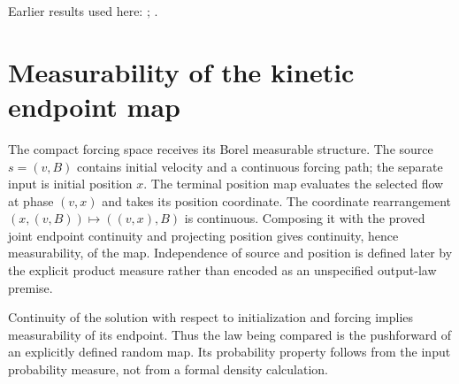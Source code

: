 \documentclass[11pt,a4paper]{article}
\begin{document}
Earlier results used here: \cite[Section~3.17.3]{LangevinLean2026ULASC}; \cite[Section~3.17.4]{LangevinLean2026ULASC}.

\section{\texorpdfstring{Measurability of the kinetic endpoint map}{Measurability of the kinetic endpoint map}}


The compact forcing space receives its Borel measurable structure. The source \(s=(v,B)\) contains initial velocity and a continuous forcing path; the separate input is initial position \(x\). The terminal position map evaluates the selected flow at phase \((v,x)\) and takes its position coordinate. The coordinate rearrangement \((x,(v,B))\mapsto((v,x),B)\) is continuous. Composing it with the proved joint endpoint continuity and projecting position gives continuity, hence measurability, of the map. Independence of source and position is defined later by the explicit product measure rather than encoded as an unspecified output-law premise.



Continuity of the solution with respect to initialization and forcing implies measurability of its endpoint. Thus the law being compared is the pushforward of an explicitly defined random map. Its probability property follows from the input probability measure, not from a formal density calculation.
\end{document}

